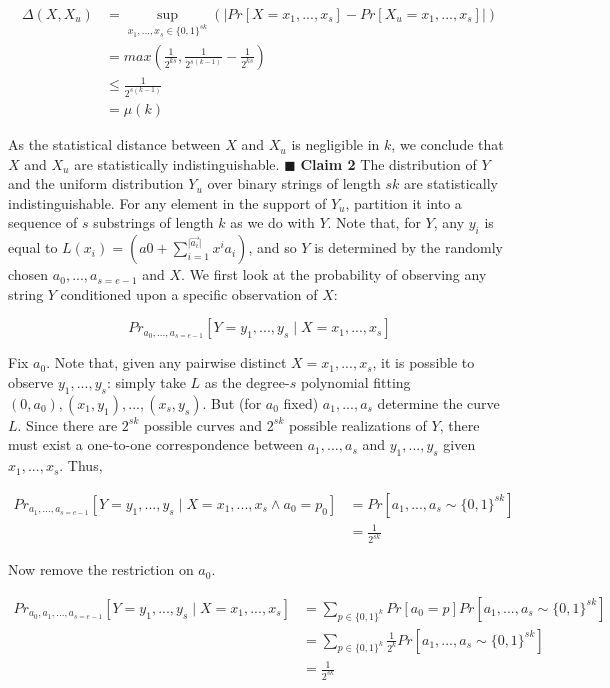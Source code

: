 \documentclass{article}
\begin{document}
\begin{align*}
\Delta(X,X_u) &= \sup_{x_1,...,x_s \in \{0,1\}^{sk}}(\lvert Pr[X=x_1,...,x_s] - Pr[X_u=x_1,...,x_s] \rvert) \\
&= max(\frac{1}{2^{ks}}, \frac{1}{2^{s(k-1)}} - \frac{1}{2^{ks}}) \\
&\leq \frac{1}{2^{s(k-1)}} \\
&= \mu(k)
\end{align*}

\noindent As the statistical distance between $X$ and $X_u$ is negligible in $k$, we conclude that $X$ and $X_u$ 
are statistically indistinguishable. $\blacksquare$
\newline\newline
\noindent \textbf{Claim 2} The distribution of $Y$ and the uniform distribution $Y_u$ over binary strings of length $sk$ 
are statistically indistinguishable.
\newline\newline
\noindent For any element in the support of $Y_u$, partition it into a sequence of $s$ substrings of length $k$ 
as we do with $Y$.  Note that, for $Y$, any $y_i$ is equal to $L(x_i) = (a0 + \sum_{i=1}^{\lvert \vec{a_i} \rvert} x^i a_i)$, 
and so $Y$ is determined by the randomly chosen $a_0,...,a_{s=e-1}$ and $X$.  We first look at the probability of 
observing any string $Y$ conditioned upon a specific observation of $X$:

\[
Pr_{a_0,...,a_{s=e-1}}[Y = y_1,...,y_s \mid X = x_1,...,x_s]
\]

\noindent Fix $a_0$.  Note that, given any pairwise distinct $X = x_1,...,x_s$, it is possible to observe $y_1,...,y_s$: simply take $L$ 
as the degree-$s$ polynomial fitting $(0,a_0),(x_1,y_1),...,(x_s,y_s)$.  But (for $a_0$ fixed) $a_1,...,a_s$ determine the 
curve $L$.  Since there are $2^{sk}$ possible curves and $2^{sk}$ possible realizations of $Y$, there must exist a one-to-one 
correspondence between $a_1,...,a_s$ and $y_1,...,y_s$ given $x_1,...,x_s$.  Thus, 

\begin{align*}
Pr_{a_1,...,a_{s=e-1}}[Y = y_1,...,y_s \mid X = x_1,...,x_s \land a_0 = p_0] &= Pr[a_1,...,a_s \sim \{0,1\}^{sk}] \\
&= \frac{1}{2^{sk}}
\end{align*}

\noindent Now remove the restriction on $a_0$. 

\begin{align*}
Pr_{a_0, a_1,...,a_{s=e-1}}[Y = y_1,...,y_s \mid X = x_1,...,x_s] &= \sum_{p \in \{0,1\}^k} Pr[a_0 = p] Pr[a_1,...,a_s \sim \{0,1\}^{sk}] \\
&= \sum_{p \in \{0,1\}^k} \frac{1}{2^k} Pr[a_1,...,a_s \sim \{0,1\}^{sk}] \\
&= \frac{1}{2^{sk}}
\end{align*}
\end{document}

